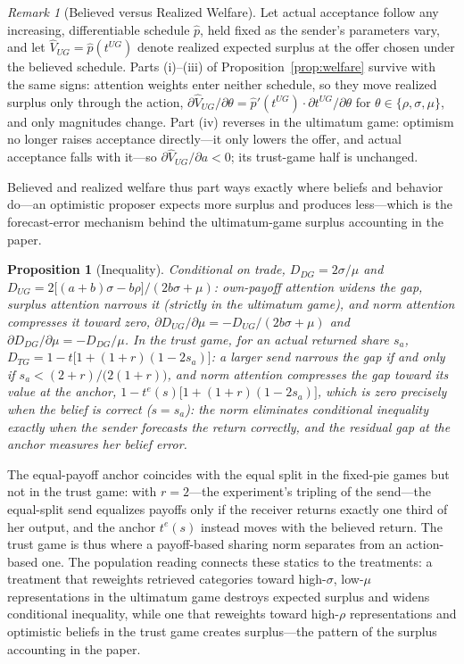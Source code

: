 \documentclass[11pt]{article}
\theoremstyle{plain}
\newtheorem{proposition}{Proposition}
\theoremstyle{remark}
\newtheorem{remark}{Remark}
\begin{document}
\begin{remark}[Believed versus Realized Welfare]
\label{rem:realized}
Let actual acceptance follow any increasing, differentiable schedule $\hat p$, held fixed as the sender's parameters vary, and let $\hat V_{UG}=\hat p(t^{UG})$ denote realized expected surplus at the offer chosen under the believed schedule. Parts (i)--(iii) of Proposition~\ref{prop:welfare} survive with the same signs: attention weights enter neither schedule, so they move realized surplus only through the action, $\partial\hat V_{UG}/\partial\theta=\hat p'(t^{UG})\cdot\partial t^{UG}/\partial\theta$ for $\theta\in\{\rho,\sigma,\mu\}$, and only magnitudes change. Part (iv) reverses in the ultimatum game: optimism no longer raises acceptance directly---it only lowers the offer, and actual acceptance falls with it---so $\partial\hat V_{UG}/\partial a<0$; its trust-game half is unchanged.
\end{remark}

Believed and realized welfare thus part ways exactly where beliefs and behavior do---an optimistic proposer expects more surplus and produces less---which is the forecast-error mechanism behind the ultimatum-game surplus accounting in the paper.

\begin{proposition}[Inequality]
\label{prop:inequality}
Conditional on trade, $D_{DG}=2\sigma/\mu$ and $D_{UG}=2\bigl[(a+b)\sigma-b\rho\bigr]/(2b\sigma+\mu)$: own-payoff attention widens the gap, surplus attention narrows it (strictly in the ultimatum game), and norm attention compresses it toward zero, $\partial D_{UG}/\partial\mu=-D_{UG}/(2b\sigma+\mu)$ and $\partial D_{DG}/\partial\mu=-D_{DG}/\mu$. In the trust game, for an actual returned share $s_{a}$, $D_{TG}=1-t\bigl[1+(1+r)(1-2s_{a})\bigr]$: a larger send narrows the gap if and only if $s_{a}<(2+r)/\bigl(2(1+r)\bigr)$, and norm attention compresses the gap toward its value at the anchor, $1-t^{e}(s)\bigl[1+(1+r)(1-2s_{a})\bigr]$, which is zero precisely when the belief is correct ($s=s_{a}$): the norm eliminates conditional inequality exactly when the sender forecasts the return correctly, and the residual gap at the anchor measures her belief error.
\end{proposition}

The equal-payoff anchor coincides with the equal split in the fixed-pie games but not in the trust game: with $r=2$---the experiment's tripling of the send---the equal-split send equalizes payoffs only if the receiver returns exactly one third of her output, and the anchor $t^{e}(s)$ instead moves with the believed return. The trust game is thus where a payoff-based sharing norm separates from an action-based one. The population reading connects these statics to the treatments: a treatment that reweights retrieved categories toward high-$\sigma$, low-$\mu$ representations in the ultimatum game destroys expected surplus and widens conditional inequality, while one that reweights toward high-$\rho$ representations and optimistic beliefs in the trust game creates surplus---the pattern of the surplus accounting in the paper.
\end{document}
